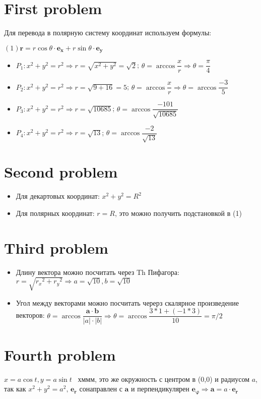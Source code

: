 \documentclass[a4paper]{article}
\begin{document}
\section{First problem}

Для перевода в полярную систему координат используем формулы:\\
\begin{centering}
	$(1)\mathbf{r}={r}\cos\theta\cdot{\mathbf{e_x}}+{r}\sin\theta\cdot{\mathbf{e_y}}$\\
\end{centering}
\begin{itemize}
	\item $P_1: x^2+y^2=r^2 \Rightarrow r=\sqrt{x^2+y^2}=\sqrt{2}$; $\theta=\arccos\dfrac{x}{r}\Rightarrow \theta=\dfrac{\pi}{4}$
	\item $P_2: x^2+y^2=r^2 \Rightarrow r=\sqrt{9+16}=5$; $\theta=\arccos\dfrac{x}{r}\Rightarrow \theta=\arccos\dfrac{-3}{5}$
	\item $P_3: x^2+y^2=r^2 \Rightarrow r=\sqrt{10685}$; $\theta=\arccos\dfrac{-101}{\sqrt{10685}}$
	\item $P_4: x^2+y^2=r^2 \Rightarrow r=\sqrt{13}$; $\theta=\arccos\dfrac{-2}{\sqrt{13}}$
\end{itemize}
\section{Second problem}
\begin{itemize}
	\item Для декартовых координат: $x^2+y^2=R^2$
	\item Для полярных координат: $r=R$, это можно получить подстановкой в (1)
\end{itemize}

\section{Third problem}
\begin{itemize}
	\item Длину вектора можно посчитать через Th Пифагора: ${r}=\sqrt{{r_x}^2+{r_y}^2} \Rightarrow a=\sqrt{10}, b=\sqrt{10}$
	\item Угол между векторами можно посчитать черерз скалярное произведение векторов: $\theta= \arccos\dfrac{\mathbf{a}\cdot\mathbf{b}}{|{a}|\cdot|{b}|}\Rightarrow \theta=\arccos\dfrac{3*1+(-1*3)}{10}=\pi/2$
\end{itemize}
\section{Fourth problem}
$x=a\cos t, y=a\sin t$  $\,$ хммм, это же окружность с центром в (0,0) и радиусом $a$, так как $x^2+y^2=a^2, \,\mathbf{e_r}$ сонаправлен с $\mathbf{a}$ и перпендикулярен $\mathbf{e_\varphi} \Rightarrow \mathbf{a}={a}\cdot\mathbf{e_r}$
\end{document}
